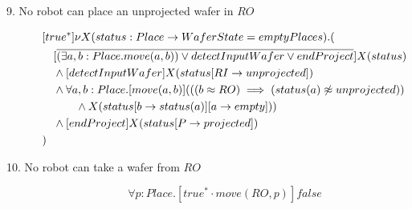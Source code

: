 \begin{description}
 \item[9. No robot can place an unprojected wafer in $RO$]

\begin{align*}
&[true^*] \nu X(status:Place \to WaferState=emptyPlaces).( \\
&\tab  [\overline{(\exists a,b:Place.move(a,b)) \vee detectInputWafer \vee endProject}]X(status) \\
&\tab  \wedge [detectInputWafer]X(status[RI \to unprojected]) \\
&\tab  \wedge \forall a,b:Place.[move(a, b)](((b \approx RO) \implies (status(a) \not \approx unprojected)) \\
&\tab\tab\tab \wedge X(status[b \to status(a)][a \to empty])) \\
&\tab  \wedge [endProject]X(status[P \to projected]) \\
&)
\end{align*}

 \item[10. No robot can take a wafer from $RO$]

\[
	\forall p:Place . [true^* \cdot move(RO, p)]false
\]

\end{description}
